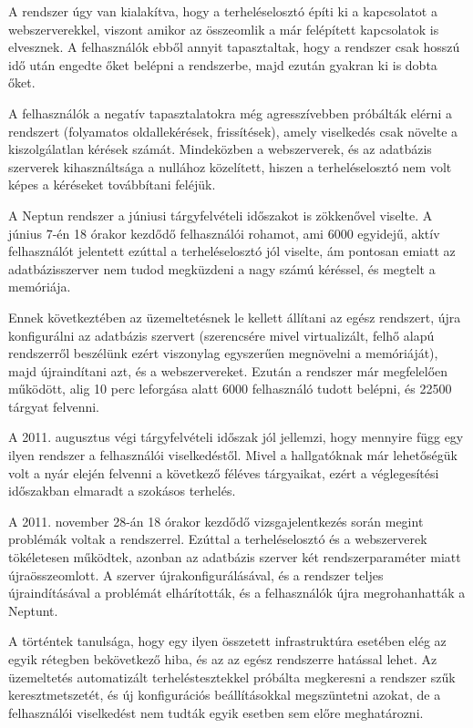 A rendszer úgy van kialakítva, hogy a terheléselosztó építi ki a kapcsolatot a webszerverekkel, viszont amikor az összeomlik a már felépített kapcsolatok is elvesznek. A felhasználók ebből annyit tapasztaltak, hogy a rendszer csak hosszú idő után engedte őket belépni a rendszerbe, majd ezután gyakran ki is dobta őket.

A felhasználók a negatív tapasztalatokra még agresszívebben próbálták elérni a rendszert (folyamatos oldallekérések, frissítések), amely viselkedés csak növelte a kiszolgálatlan kérések számát. Mindeközben a webszerverek, és az adatbázis szerverek kihasználtsága a nullához közelített, hiszen a terheléselosztó nem   volt képes a kéréseket továbbítani feléjük.

A Neptun rendszer a júniusi tárgyfelvételi időszakot is zökkenővel viselte. A június 7-én 18 órakor kezdődő felhasználói rohamot, ami 6000 egyidejű, aktív felhasználót jelentett ezúttal a terheléselosztó jól viselte, ám pontosan emiatt az adatbázisszerver nem tudod megküzdeni a nagy számú kéréssel, és megtelt a memóriája.

Ennek következtében az üzemeltetésnek le kellett állítani az egész rendszert, újra konfigurálni az adatbázis szervert (szerencsére mivel virtualizált, felhő alapú rendszerről beszélünk ezért viszonylag egyszerűen megnövelni a memóriáját), majd újraindítani azt, és a webszervereket. Ezután a rendszer már megfelelően működött, alig 10 perc leforgása alatt 6000 felhasználó tudott belépni, és 22500 tárgyat felvenni.

A 2011. augusztus végi tárgyfelvételi időszak jól jellemzi, hogy mennyire függ egy ilyen rendszer a felhasználói viselkedéstől.  Mivel a hallgatóknak már lehetőségük volt a nyár elején felvenni a következő féléves tárgyaikat, ezért a véglegesítési időszakban elmaradt a szokásos terhelés.

A 2011. november 28-án 18 órakor kezdődő vizsgajelentkezés során megint problémák voltak a rendszerrel. Ezúttal a terheléselosztó és a webszerverek tökéletesen működtek, azonban az adatbázis szerver két rendszerparaméter miatt újraösszeomlott. A szerver újrakonfigurálásával, és a rendszer teljes újraindításával a problémát elhárították, és a felhasználók újra megrohanhatták a Neptunt.

A történtek tanulsága, hogy egy ilyen összetett infrastruktúra esetében elég az egyik rétegben bekövetkező hiba, és az az egész rendszerre hatással lehet. Az üzemeltetés automatizált terheléstesztekkel próbálta megkeresni a rendszer szűk keresztmetszetét, és új konfigurációs beállításokkal megszüntetni azokat, de a felhasználói viselkedést nem tudták egyik esetben sem előre meghatározni.

